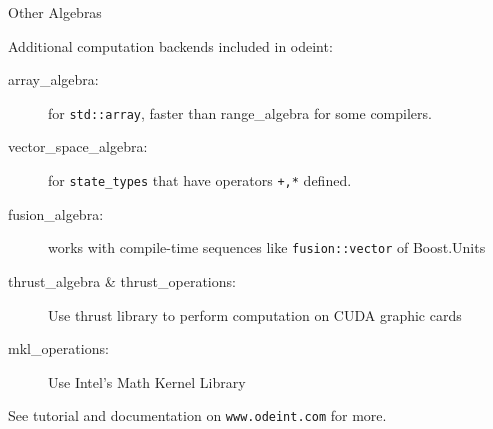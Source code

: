 \documentclass{beamer}
\newcommand{\heading}[1]{\centerline{\Large #1} \vspace{0.5em}}
\begin{document}
\begin{frame}[fragile]
 \heading{Other Algebras}

 \vspace{1ex}
 
 Additional computation backends included in odeint:
 
\begin{description}
 \item[array\_algebra:] for \lstinline+std::array+, faster than range\_algebra for some compilers.
 \item[vector\_space\_algebra:] for \lstinline+state_types+ that have operators \lstinline!+,*! defined.
 \item[fusion\_algebra:] works with compile-time sequences like \lstinline+fusion::vector+ of Boost.Units
 \item[thrust\_algebra \& thrust\_operations:] Use thrust library to perform computation on CUDA graphic cards
 \item[mkl\_operations:] Use Intel's Math Kernel Library
\end{description}

See tutorial and documentation on \verb+www.odeint.com+ for more.

\end{frame}
\end{document}
